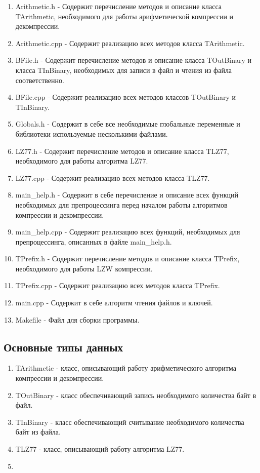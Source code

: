 \documentclass[12pt]{article}
\begin{document}
\begin{enumerate}
	\item Arithmetic.h - Содержит перечисление методов и описание класса TArithmetic, необходимого для работы арифметической компрессии и декомпрессии. 
	\item Arithmetic.cpp - Содержит реализацию всех методов класса TArithmetic.
	\item BFile.h - Содержит перечисление методов и описание класса TOutBinary и класса TInBinary, необходимых для записи в файл и чтения из файла соответственно.
	\item BFile.cpp - Содержит реализацию всех методов классов TOutBinary и TInBinary.
	\item Globals.h - Содержит в себе все необходимые глобальные переменные и библиотеки используемые несколькими файлами.
	\item LZ77.h - Содержит перечисление методов и описание класса TLZ77, необходимого для работы алгоритма LZ77.
	\item LZ77.cpp - Содержит реализацию всех методов класса TLZ77.
	\item main\_help.h - Содержит в себе перечисление и описание всех функций необходимых для препроцессинга перед началом работы алгоритмов компрессии и декомпрессии.
	\item main\_help.cpp - Содержит реализацию всех функций, необходимых для препроцессинга, описанных в файле main\_help.h.
	\item TPrefix.h - Содержит перечисление методов и описание класса TPrefix, необходимого для работы LZW компрессии.
	\item TPrefix.cpp - Содержит реализацию всех методов класса TPrefix.
	\item main.cpp - Содержит в себе алгоритм чтения файлов и ключей.
	\item Makefile - Файл для сборки программы.
\end{enumerate}

\subsection*{Основные типы данных}

\begin{enumerate}%
	\item TArithmetic - класс, описывающий работу арифметического алгоритма компрессии и декомпрессии.
	\item TOutBinary - класс обеспечивающий запись необходимого количества байт в файл.
	\item TInBinary - класс обеспечивающий считывание необходимого количества байт из файла.
	\item TLZ77 - класс, описывающий работу алгоритма LZ77.
	\item 
\end{enumerate}
\end{document}
